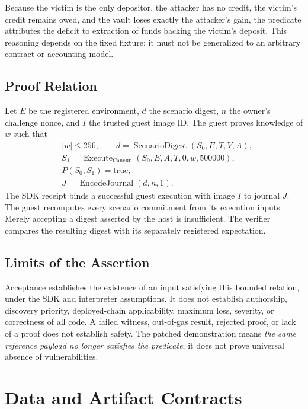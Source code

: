 \documentclass[11pt]{article}
\begin{document}
Because the victim is the only depositor, the attacker has no credit, the victim's credit remains owed, and the vault loses exactly the attacker's gain, the predicate attributes the deficit to extraction of funds backing the victim's deposit. This reasoning depends on the fixed fixture; it must not be generalized to an arbitrary contract or accounting model.

\subsection{Proof Relation}
Let \(E\) be the registered environment, \(d\) the scenario digest, \(n\) the owner's challenge nonce, and \(I\) the trusted guest image ID. The guest proves knowledge of \(w\) such that
\begin{equation}
\begin{aligned}
& |w|\leq256,\qquad d=\operatorname{ScenarioDigest}(S_0,E,T,V,A),\\
& S_1=\operatorname{Execute}_{\mathrm{Cancun}}(S_0,E,A,T,0,w,500000),\\
& P(S_0,S_1)=\mathrm{true},\\
& J=\operatorname{EncodeJournal}(d,n,1).
\end{aligned}
\end{equation}
The SDK receipt binds a successful guest execution with image \(I\) to journal \(J\). The guest recomputes every scenario commitment from its execution inputs. Merely accepting a digest asserted by the host is insufficient. The verifier compares the resulting digest with its separately registered expectation.

\subsection{Limits of the Assertion}
Acceptance establishes the existence of an input satisfying this bounded relation, under the SDK and interpreter assumptions. It does not establish authorship, discovery priority, deployed-chain applicability, maximum loss, severity, or correctness of all code. A failed witness, out-of-gas result, rejected proof, or lack of a proof does not establish safety. The patched demonstration means \emph{the same reference payload no longer satisfies the predicate}; it does not prove universal absence of vulnerabilities.

\section{Data and Artifact Contracts}
\end{document}
